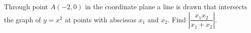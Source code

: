 Through point $A(-2,0)$ in the coordinate plane a line is drawn that intersects the graph of $y=x^{2}$ at points with abscissas $x_{1}$ and $x_{2}$. Find $\left|\dfrac{x_{1}x_{2}}{x_{1}+x_{2}}\right|$.
